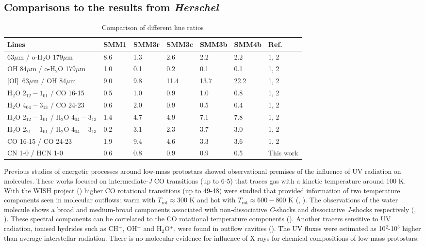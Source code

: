 \documentclass{aa}
\begin{document}
\subsection{Comparisons to the results from \textit{Herschel}}
\label{subsection:herschel}


\begin{table*} 
\caption{Comparison of different line ratios} 
\centering %
\label{line_ratios} 

\begin{tabular}{l l l l l l l} 
\hline\hline 
Lines & SMM1 & SMM3r & SMM3c & SMM3b & SMM4b & Ref. \\ 
\hline 
[OI] 63$\mu$m / o-H$_2$O 179$\mu$m & 8.6 & 1.3 & 2.6 & 2.2 & 2.2 & 1, 2 \\ 
OH 84$\mu$m  / o-H$_2$O 179$\mu$m & 1.0 & 0.1 & 0.2 & 0.1 & 0.1 & 1, 2 \\ 
\mbox{[OI] 63$\mu$m} / OH 84$\mu$m & 9.0 & 9.8 & 11.4 & 13.7 & 22.2 & 1, 2 \\
H$_2$O $2_{12}-1_{01}$ / CO 16-15 & 0.5 & 1.0 & 0.9 & 1.0 & 0.8 & 1, 2 \\ 
H$_2$O $4_{04}-3_{13}$ / CO 24-23 & 0.6 & 2.0 & 0.9 & 0.5 & 0.4 & 1, 2\\
H$_2$O $2_{12}-1_{01}$ / H$_2$O $4_{04}-3_{13}$ & 1.4 & 4.7 & 4.9 & 7.1 & 7.8 & 1, 2\\
H$_2$O $2_{21}-1_{01}$ / H$_2$O $4_{04}-3_{13}$ & 0.2 & 3.1 & 2.3 & 3.7 & 3.0 & 1, 2\\
CO 16-15 / CO 24-23 & 1.9 & 9.4 & 4.6 & 3.3 & 3.6 & 1, 2 \\
CN 1-0 / HCN 1-0 & 0.6 & 0.8 & 0.9 & 0.9 & 0.5 & This work\\
\hline \end{tabular} 
\end{table*}


Previous studies of energetic processes around low-mass protostars showed observational premises of
the influence of UV radiation on molecules. These works focused on intermediate-\textit{J} CO
transitions (up to 6-5) that traces gas with a kinetic temperature around 100 K. With the WISH project (\citealt{vDi11}) higher CO
rotational transitions (up to 49-48) were studied that provided information of two temperature
components seen in molecular outflows: warm with $T_\mathrm{rot} \approx 300$ K and hot with
$T_\mathrm{rot} \approx 600-800$ K (\citealt{Kar13}, \citealt{Gre13}). The observations of the water
molecule shows a broad and medium-broad components associated with non-dissociative \textit{C}-shocks and dissociative \textit{J}-shocks respectively (\citealt{Kri13}, \citealt{Mot14}). These
spectral components can be correlated to the CO rotational temperature components (\citealt{Kri17}).
Another tracers sensitive to UV radiation, ionised hydrides such as CH$^+$, OH$^+$ and H$_2$O$^+$,
were found in outflow cavities (\citealt{Ben16}). The UV fluxes were estimated as 10$^2$-10$^3$
higher than average interstellar radiation. There is no molecular evidence for influence of X-rays
for chemical compositions of low-mass protostars.
\end{document}
